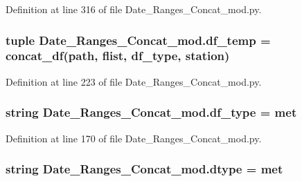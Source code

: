 Definition at line 316 of file Date\+\_\+\+Ranges\+\_\+\+Concat\+\_\+mod.\+py.

\hypertarget{namespace_date___ranges___concat__mod_a04bb47c20aa18f8069297fa57a209bf7}{}
\subsubsection[{df\+\_\+temp}]{\setlength{\rightskip}{0pt plus 5cm}tuple Date\+\_\+\+Ranges\+\_\+\+Concat\+\_\+mod.\+df\+\_\+temp = {\bf concat\+\_\+df}({\bf path}, {\bf flist}, {\bf df\+\_\+type}, {\bf station})}\label{namespace_date___ranges___concat__mod_a04bb47c20aa18f8069297fa57a209bf7}


Definition at line 223 of file Date\+\_\+\+Ranges\+\_\+\+Concat\+\_\+mod.\+py.

\hypertarget{namespace_date___ranges___concat__mod_a9af9fbcb29f8cbf5b5bec5151e049dec}{}
\subsubsection[{df\+\_\+type}]{\setlength{\rightskip}{0pt plus 5cm}string Date\+\_\+\+Ranges\+\_\+\+Concat\+\_\+mod.\+df\+\_\+type = \textquotesingle{}met\textquotesingle{}}\label{namespace_date___ranges___concat__mod_a9af9fbcb29f8cbf5b5bec5151e049dec}


Definition at line 170 of file Date\+\_\+\+Ranges\+\_\+\+Concat\+\_\+mod.\+py.

\hypertarget{namespace_date___ranges___concat__mod_ae6e8c46e0d34c589ba7dd3d913aeb040}{}
\subsubsection[{dtype}]{\setlength{\rightskip}{0pt plus 5cm}string Date\+\_\+\+Ranges\+\_\+\+Concat\+\_\+mod.\+dtype = \textquotesingle{}met\textquotesingle{}}\label{namespace_date___ranges___concat__mod_ae6e8c46e0d34c589ba7dd3d913aeb040}


